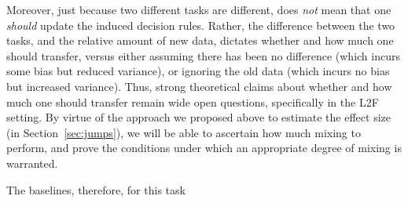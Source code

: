 \documentclass{article}
\begin{document}
Moreover, just because two different tasks are different, does \emph{not} mean that one \emph{should} update the induced decision rules.  Rather, the difference between the two tasks, and the relative amount of new data, dictates whether and how much one should transfer, versus either assuming there has been no difference (which incurs some bias but reduced variance), or ignoring the old data (which incurs no bias but increased variance).  Thus, strong theoretical claims about whether and how much one should transfer remain wide open questions, specifically in the L2F setting.  By virtue of the approach we proposed above to estimate the effect size (in Section~\ref{sec:jumps}), we will be able to ascertain how much mixing to perform, and prove the conditions under which an appropriate degree of mixing is warranted. 

The baselines, therefore, for this task 
\end{document}
